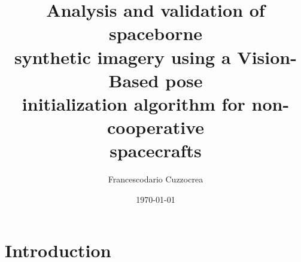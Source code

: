 \documentclass[10pt]{beamer}
\title{Analysis and validation of spaceborne \\ synthetic imagery using a Vision-Based pose \\ initialization algorithm for non-cooperative \\ spacecrafts}
\subtitle{}
\author{Francescodario Cuzzocrea}
\date{\today}
\begin{document}
{
  \vfuzz=90pt
}

\begin{frame}
  \maketitle
\end{frame}

\section{Introduction}

\begin{frame}[plain]{}
  \sectionpage
\end{frame}
\end{document}
